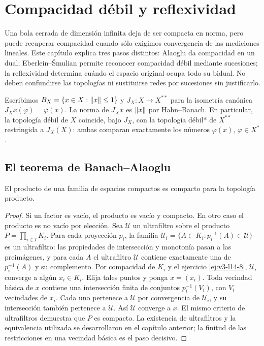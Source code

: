 \chapter{Compacidad débil y reflexividad}\label{cap:v3-09}
Una bola cerrada de dimensión infinita deja de ser compacta en norma, pero puede recuperar compacidad cuando sólo exigimos convergencia de las mediciones lineales. Este capítulo explica tres pasos distintos: Alaoglu da compacidad en un dual; Eberlein--Šmulian permite reconocer compacidad débil mediante sucesiones; la reflexividad determina cuándo el espacio original ocupa todo su bidual. No deben confundirse las topologías ni sustituirse redes por sucesiones sin justificarlo.

Escribimos $B_X=\{x\in X:\left\lVert x\right\rVert\leq1\}$ y $J_X:X\to X^{**}$ para la isometría canónica $J_Xx(\varphi)=\varphi(x)$. La norma de $J_Xx$ es $\left\lVert x\right\rVert$ por Hahn--Banach. En particular, la topología débil de $X$ coincide, bajo $J_X$, con la topología débil* de $X^{**}$ restringida a $J_X(X)$: ambas comparan exactamente los números $\varphi(x)$, $\varphi\in X^*$.

\section{El teorema de Banach--Alaoglu}\label{lec:v3-16}
\begin{lema}[Tychonoff]\label{v3:tychonoff}
El producto de una familia de espacios compactos es compacto para la topología producto.
\end{lema}
\begin{proof}
Si un factor es vacío, el producto es vacío y compacto. En otro caso el producto es no vacío por elección. Sea $\mathcal U$ un ultrafiltro sobre el producto $P=\prod_{i\in I}K_i$. Para cada proyección $p_i$, la familia $\mathcal U_i=\{A\subset K_i:p_i^{-1}(A)\in\mathcal U\}$ es un ultrafiltro: las propiedades de intersección y monotonía pasan a las preimágenes, y para cada $A$ el ultrafiltro $\mathcal U$ contiene exactamente una de $p_i^{-1}(A)$ y su complemento. Por compacidad de $K_i$ y el ejercicio \ref{ej:v3-l14-8}, $\mathcal U_i$ converge a algún $x_i\in K_i$. Elija tales puntos y ponga $x=(x_i)$. Toda vecindad básica de $x$ contiene una intersección finita de conjuntos $p_i^{-1}(V_i)$, con $V_i$ vecindades de $x_i$. Cada uno pertenece a $\mathcal U$ por convergencia de $\mathcal U_i$, y su intersección también pertenece a $\mathcal U$. Así $\mathcal U$ converge a $x$. El mismo criterio de ultrafiltros demuestra que $P$ es compacto. La existencia de ultrafiltros y la equivalencia utilizada se desarrollaron en el capítulo anterior; la finitud de las restricciones en una vecindad básica es el paso decisivo.
\end{proof}

